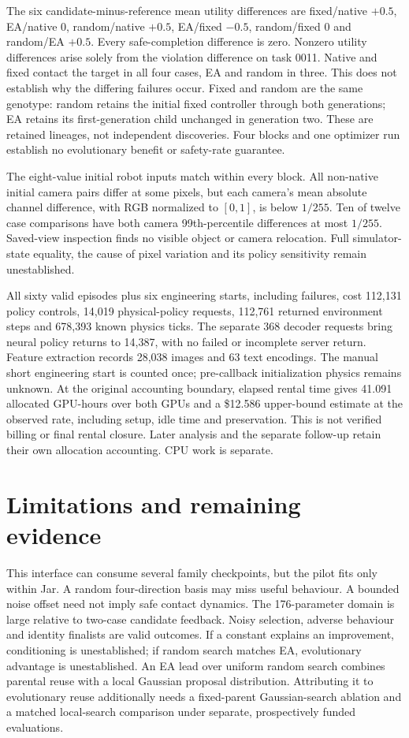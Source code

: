 \documentclass[sigconf,dvipsnames,balance=false]{acmart}
\begin{document}
The six candidate-minus-reference mean utility differences are fixed/native
$+0.5$, EA/native $0$, random/native $+0.5$, EA/fixed $-0.5$, random/fixed $0$
and random/EA $+0.5$. Every safe-completion difference is zero. Nonzero utility
differences arise solely from the violation difference on task 0011. Native and
fixed contact the target in all four cases, EA and random in three. This does
not establish why the differing failures occur. Fixed and random are the same
genotype: random retains the initial fixed controller through both generations;
EA retains its first-generation child unchanged in generation two. These are
retained lineages, not independent discoveries. Four blocks and one optimizer
run establish no evolutionary benefit or safety-rate guarantee.

The eight-value initial robot inputs match within every block. All non-native
initial camera pairs differ at some pixels, but each camera's mean absolute
channel difference, with RGB normalized to $[0,1]$, is below $1/255$.
Ten of twelve case comparisons have both
camera 99th-percentile differences at most $1/255$. Saved-view inspection finds
no visible object or camera relocation. Full simulator-state equality, the
cause of pixel variation and its policy sensitivity remain unestablished.

All sixty valid episodes plus six engineering starts, including failures,
cost 112,131 policy controls, 14,019 physical-policy requests, 112,761 returned
environment steps and 678,393 known physics ticks. The separate 368 decoder
requests bring neural policy returns to 14,387, with no failed or incomplete
server return. Feature extraction records 28,038 images and 63 text encodings.
The manual short engineering start is counted once; pre-callback initialization
physics remains unknown. At the original accounting boundary, elapsed rental
time gives 41.091 allocated GPU-hours over both GPUs and a \$12.586 upper-bound
estimate at the observed rate, including setup, idle time and preservation.
This is not verified billing or final rental closure. Later analysis and the
separate follow-up retain their own allocation accounting. CPU work is separate.



\section{Limitations and remaining evidence}
This interface can consume several family checkpoints, but the pilot fits only
within Jar. A random four-direction basis may miss useful behaviour. A bounded
noise offset need not imply safe contact dynamics. The 176-parameter domain is
large relative to two-case candidate feedback. Noisy selection, adverse behaviour
and identity finalists are valid outcomes. If a constant explains an improvement,
conditioning is unestablished; if random search matches EA, evolutionary advantage
is unestablished.
An EA lead over uniform random search combines parental reuse with a local
Gaussian proposal distribution. Attributing it to evolutionary reuse additionally
needs a fixed-parent Gaussian-search ablation and a matched local-search comparison
under separate, prospectively funded evaluations.
\end{document}
